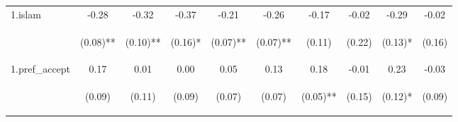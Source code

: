 \begin{center}
\begin{tabular}{lccccccccc}
\noalign{\smallskip}1.islam & -0.28 & -0.32 & -0.37 & -0.21 & -0.26 & -0.17 & -0.02 & -0.29 & -0.02\\
 & \begin{footnotesize}(0.08)**\end{footnotesize} & \begin{footnotesize}(0.10)**\end{footnotesize} & \begin{footnotesize}(0.16)*\end{footnotesize} & \begin{footnotesize}(0.07)**\end{footnotesize} & \begin{footnotesize}(0.07)**\end{footnotesize} & \begin{footnotesize}(0.11)\end{footnotesize} & \begin{footnotesize}(0.22)\end{footnotesize} & \begin{footnotesize}(0.13)*\end{footnotesize} & \begin{footnotesize}(0.16)\end{footnotesize}\\
\noalign{\smallskip}1.pref_accept & 0.17 & 0.01 & 0.00 & 0.05 & 0.13 & 0.18 & -0.01 & 0.23 & -0.03\\
 & \begin{footnotesize}(0.09)\end{footnotesize} & \begin{footnotesize}(0.11)\end{footnotesize} & \begin{footnotesize}(0.09)\end{footnotesize} & \begin{footnotesize}(0.07)\end{footnotesize} & \begin{footnotesize}(0.07)\end{footnotesize} & \begin{footnotesize}(0.05)**\end{footnotesize} & \begin{footnotesize}(0.15)\end{footnotesize} & \begin{footnotesize}(0.12)*\end{footnotesize} & \begin{footnotesize}(0.09)\end{footnotesize}\\

\end{tabular}
\end{center}
